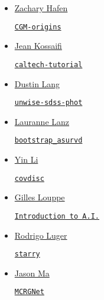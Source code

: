 \documentclass[11pt,a4paper]{article}
\begin{document}
\begin{itemize}
\begin{itemize}
  \end{itemize}

\item \href{https://github.com/zhafen/}{Zachary Hafen} 
  \begin{itemize}
    \href{https://github.com/zhafen/CGM-origins}{\tt CGM-origins}
  \end{itemize}

\item \href{https://github.com/JeanKossaifi}{Jean Kossaifi}
  \begin{itemize}
    \href{https://github.com/JeanKossaifi/caltech-tutorial}{{\tt caltech-tutorial}}
  \end{itemize}
  
\item \href{https://github.com/dstndstn}{Dustin Lang}
  \begin{itemize}
   \href{https://github.com/dstndstn/unwise-sdss-phot}{\tt unwise-sdss-phot}
   \end{itemize}

\item \href{https://github.com/lalanz/}{Lauranne Lanz}
  \begin{itemize}
    \href{https://github.com/lalanz/bootstrap\_asurv}{\tt bootstrap\_asurvd}
  \end{itemize}

\item \href{https://github.com/eelregit/}{Yin Li} 
  \begin{itemize}
    \href{https://github.com/eelregit/covdisc}{\tt covdisc}
  \end{itemize}

\item \href{https://github.com/glouppe}{Gilles Louppe}
  \begin{itemize}
    \href{https://github.com/glouppe/info8006-introduction-to-ai}{\tt  Introduction to A.I.}
  \end{itemize}

\item \href{https://github.com/rodluger}{Rodrigo Luger}
  \begin{itemize}
    \href{https://github.com/rodluger/starry}{{\tt starry}}
  \end{itemize}

\item \href{https://github.com/myinxd}{Jason Ma}
  \begin{itemize}
    \href{https://github.com/myinxd/mcrgnet}{\tt MCRGNet}
  \end{itemize}


\end{itemize}
\end{document}
